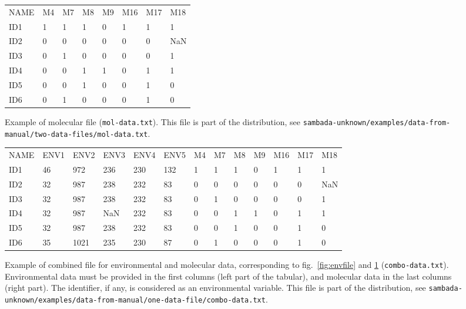\documentclass[a4paper,11pt]{article}
\newcommand{\versionnumber}{unknown}
\newcommand{\pathtodatafrommanual}{\texttt{sambada-\versionnumber/examples/data-from-manual/}}
\newcommand{\pathtoonedatafile}{\pathtodatafrommanual\texttt{one-data-file/}}
\newcommand{\pathtotwodatafiles}{\pathtodatafrommanual\texttt{two-data-files/}}
\begin{document}
\begin{figure}[htbp]

\begin{center}
		\begin{mdframed}[backgroundcolor=white,userdefinedwidth=10cm,align=center]
		\begin{tabular}{llllllll}
NAME&	M4	&M7	&M8	&M9	&M16	&M17	&M18\\
ID1&	 1	&1	&1	&0	&1	&1	&1\\
ID2& 0	&0	&0	&0	&0	&0	&NaN\\
ID3& 0	&1	&0	&0	&0	&0	&1\\
ID4& 0	&0	&1	&1	&0	&1	&1\\
ID5& 0	&0	&1	&0	&0	&1	&0\\
ID6& 0	&1	&0	&0	&0	&1	&0\\
		\end{tabular}
	\end{mdframed}
	\caption{Example of molecular file (\texttt{mol-data.txt}).
	This file is part of the distribution, see 
	\pathtotwodatafiles\texttt{mol-data.txt}.
	}
	\label{fig:molfile}
	\end{center}
\end{figure}

\begin{figure}[h!]
\begin{center}
\scriptsize
		\begin{mdframed}[backgroundcolor=white,userdefinedwidth=14.5cm,align=center]
		\begin{tabular}{*{13}{l}}
NAME&	ENV1	&ENV2	&ENV3	&ENV4	&ENV5		&	M4	&M7	&M8	&M9	&M16	&M17	&M18\\
ID1	&	46	&	972	&	236	&	230	&	132	&		1	&1	&1	&0	&1	&1	&1\\
ID2	&	32	&	987	&	238	&	232	&	83	&	 0	&0	&0	&0	&0	&0	&NaN\\	
ID3	&	32	&	987	&	238	&	232	&	83	&	 0	&1	&0	&0	&0	&0	&1\\	
ID4	&	32	&	987	&	NaN	&	232	&	83	&	 0	&0	&1	&1	&0	&1	&1\\	
ID5	&	32	&	987	&	238	&	232	&	83	& 	0	&0	&1	&0	&0	&1	&0\\	
ID6	&	35	&	1021	&	235	&	230	&	87	& 	0	&1	&0	&0	&0	&1	&0\\	
		\end{tabular}
	\end{mdframed}
	\caption{Example of combined file for environmental and molecular data, corresponding to fig.~\ref{fig:envfile} and \ref{fig:molfile} (\texttt{combo-data.txt}).
	Environmental data must be provided in the first columns (left part of the tabular), and molecular data in the last columns (right part).
	The identifier, if any, is considered as an environmental variable.
	This file is part of the distribution, see 
	\pathtoonedatafile\texttt{combo-data.txt}.
	}
	\label{fig:molenvfile}
	\end{center}
\end{figure}
\end{document}
